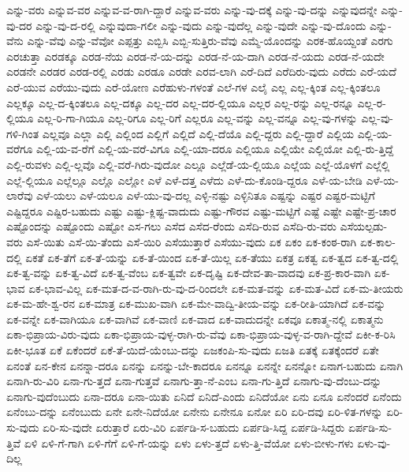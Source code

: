 {ಎನ್ನು-ವರು
ಎನ್ನುವ-ವರ
ಎನ್ನುವ-ವ-ರಾಗಿ-ದ್ದಾರೆ
ಎನ್ನುವ-ವರು
ಎನ್ನು-ವು-ದಕ್ಕೆ
ಎನ್ನು-ವು-ದನ್ನು
ಎನ್ನುವುದನ್ನೇ
ಎನ್ನು-ವು-ದರ
ಎನ್ನು-ವು-ದ-ರಲ್ಲಿ
ಎನ್ನುವುದಾ-ಗಲೀ
ಎನ್ನು-ವುದು
ಎನ್ನು-ವುದೆಲ್ಲ
ಎನ್ನು-ವುದೇ
ಎನ್ನು-ವು-ದೊಂದು
ಎನ್ನು-ವೆನು
ಎನ್ನು-ವೆವು
ಎನ್ನು-ವೆವೋ
ಎಪ್ಪತ್ತು
ಎಬ್ಬಿಸಿ
ಎಬ್ಬಿ-ಸುತ್ತಿರು-ವೆವು
ಎಮ್ಮೆ-ಯೊಂದನ್ನು
ಎರಕ-ಹೊಯ್ದಂತೆ
ಎರಗು
ಎರಚುತ್ತಾ
ಎರಡಕ್ಕೂ
ಎರಡ-ನೆಯ
ಎರಡ-ನೆ-ಯ-ದನ್ನು
ಎರಡ-ನೆ-ಯ-ದಾಗಿ
ಎರಡ-ನೆ-ಯದು
ಎರಡ-ನೆ-ಯದೇ
ಎರಡನೇ
ಎರಡರ
ಎರಡ-ರಲ್ಲಿ
ಎರಡು
ಎರಡೂ
ಎರಡೇ
ಎರವ-ಲಾಗಿ
ಎರೆ-ದಿದೆ
ಎರೆದಿರು-ವುದು
ಎರೆದು
ಎರೆ-ಯದೆ
ಎರೆ-ಯುವ
ಎರೆಯು-ವುದು
ಎರೆ-ಯೋಣ
ಎರೆಹುಳು-ಗಳಂತೆ
ಎಲೆ-ಗಳ
ಎಲೈ
ಎಲ್ಲ
ಎಲ್ಲ-ಕ್ಕಿಂತ
ಎಲ್ಲ-ಕ್ಕಿಂತಲೂ
ಎಲ್ಲಕ್ಕೂ
ಎಲ್ಲ-ದ-ಕ್ಕಿಂತಲೂ
ಎಲ್ಲ-ದಕ್ಕೂ
ಎಲ್ಲ-ದರ
ಎಲ್ಲ-ದರ-ಲ್ಲಿಯೂ
ಎಲ್ಲರ
ಎಲ್ಲ-ರನ್ನು
ಎಲ್ಲ-ರನ್ನೂ
ಎಲ್ಲ-ರ-ಲ್ಲಿಯೂ
ಎಲ್ಲ-ರಿ-ಗಾ-ಗಿಯೂ
ಎಲ್ಲ-ರಿಗೂ
ಎಲ್ಲ-ರಿಗೆ
ಎಲ್ಲರೂ
ಎಲ್ಲ-ವನ್ನು
ಎಲ್ಲ-ವನ್ನೂ
ಎಲ್ಲ-ವು-ಗಳನ್ನು
ಎಲ್ಲ-ವು-ಗಳಿ-ಗಿಂತ
ಎಲ್ಲವೂ
ಎಲ್ಲಾ
ಎಲ್ಲಿ
ಎಲ್ಲಿಂದ
ಎಲ್ಲಿಗೆ
ಎಲ್ಲಿದೆ
ಎಲ್ಲಿ-ದೆಯೊ
ಎಲ್ಲಿ-ದ್ದರು
ಎಲ್ಲಿ-ದ್ದಾರೆ
ಎಲ್ಲಿಯ
ಎಲ್ಲಿ-ಯ-ವರೆಗೂ
ಎಲ್ಲಿ-ಯ-ವ-ರೆಗೆ
ಎಲ್ಲಿ-ಯ-ವರೆ-ವಿಗೂ
ಎಲ್ಲಿ-ಯಾ-ದರೂ
ಎಲ್ಲಿಯೂ
ಎಲ್ಲಿಯೇ
ಎಲ್ಲಿಯೋ
ಎಲ್ಲಿ-ರು-ತ್ತಿದ್ದೆ
ಎಲ್ಲಿ-ರುವಳು
ಎಲ್ಲಿ-ಲ್ಲವೊ
ಎಲ್ಲಿ-ವರೆ-ಗಿರು-ವುದೋ
ಎಲ್ಲೂ
ಎಲ್ಲೆಡೆ-ಯ-ಲ್ಲಿಯೂ
ಎಲ್ಲೆಯ
ಎಲ್ಲೆ-ಯೊಳಗೆ
ಎಲ್ಲೆಲ್ಲಿ
ಎಲ್ಲೆ-ಲ್ಲಿಯೂ
ಎಲ್ಲೆಲ್ಲೂ
ಎಲ್ಲೊ
ಎಲ್ಲೋ
ಎಳೆ
ಎಳೆ-ದತ್ತ
ಎಳೆದು
ಎಳೆ-ದು-ಕೊಂಡಿ-ದ್ದರೂ
ಎಳೆ-ಯ-ಬೇಡಿ
ಎಳೆ-ಯ-ಲಾರೆವು
ಎಳೆ-ಯಲು
ಎಳೆ-ಯಲೂ
ಎಳೆ-ಯು-ವು-ದಲ್ಲ
ಎಳ್ಳಿ-ನಷ್ಟು
ಎಳ್ಳಿನಿತೂ
ಎಷ್ಟನ್ನು
ಎಷ್ಟರ
ಎಷ್ಟರ-ಮಟ್ಟಿಗೆ
ಎಷ್ಟಿದ್ದರೂ
ಎಷ್ಟಿರ-ಬಹುದು
ಎಷ್ಟು
ಎಷ್ಟು-ಕ್ಲಿಷ್ಟ-ವಾದುದು
ಎಷ್ಟು-ಗೌರವ
ಎಷ್ಟು-ಮಟ್ಟಿಗೆ
ಎಷ್ಟೆ
ಎಷ್ಟೇ
ಎಷ್ಟೇ-ಪ್ರ-ಚಾರ
ಎಷ್ಟೊಂದನ್ನು
ಎಷ್ಟೊಂದು
ಎಷ್ಟೋ
ಎಸ-ಗಲು
ಎಸೆದ
ಎಸೆದ-ರೆಂದು
ಎಸೆದಿ-ರುವ
ಎಸೆದಿ-ರು-ವರು
ಎಸೆಯಲ್ಪಡು-ವರು
ಎಸೆ-ಯಿತು
ಎಸೆ-ಯಿ-ತೆಂದು
ಎಸೆ-ಯಿರಿ
ಎಸೆಯುತ್ತಾರೆ
ಎಸೆಯು-ವುದು
ಏಕ
ಏಕಂ
ಏಕ-ಕಂಠ-ರಾಗಿ
ಏಕ-ಕಾಲ-ದಲ್ಲಿ
ಏಕತೆ
ಏಕ-ತೆಗೆ
ಏಕ-ತೆ-ಯನ್ನು
ಏಕ-ತೆ-ಯಿಂದ
ಏಕ-ತೆ-ಯಿಲ್ಲ
ಏಕ-ತೆಯು
ಏಕತ್ರ
ಏಕತ್ವ
ಏಕ-ತ್ವದ
ಏಕ-ತ್ವ-ದಲ್ಲಿ
ಏಕ-ತ್ವ-ವನ್ನು
ಏಕ-ತ್ವ-ವಿದೆ
ಏಕ-ತ್ವ-ವೆಂಬ
ಏಕ-ತ್ವವೇ
ಏಕ-ದೃಷ್ಟಿ
ಏಕ-ದೇವ-ತಾ-ವಾದವು
ಏಕ-ಪ್ರ-ಕಾರ-ವಾಗಿ
ಏಕ-ಭಾವ
ಏಕ-ಭಾವ-ವಿಲ್ಲ
ಏಕ-ಮತ-ದ-ವ-ರಾಗಿ-ರು-ವು-ದ-ರಿಂದಲೇ
ಏಕ-ಮತ-ವನ್ನು
ಏಕ-ಮತ-ವಿದೆ
ಏಕ-ಮ-ತೀಯರು
ಏಕ-ಮ-ಹೇ-ಶ್ವ-ರನ
ಏಕ-ಮಾತ್ರ
ಏಕ-ಮುಖ-ವಾಗಿ
ಏಕ-ಮೇ-ವಾದ್ವಿ-ತೀಯ-ವನ್ನು
ಏಕ-ರೀತಿ-ಯಾಗಿದೆ
ಏಕ-ವನ್ನು
ಏಕ-ವನ್ನೇ
ಏಕ-ವಾಗಿಯೂ
ಏಕ-ವಾಗಿವೆ
ಏಕ-ವಾಣಿ
ಏಕ-ವಾದ
ಏಕ-ವಾದುದನ್ನೇ
ಏಕವೂ
ಏಕಾತ್ಮ-ನಲ್ಲಿ
ಏಕಾತ್ಮನು
ಏಕಾ-ಭಿಪ್ರಾಯ-ವಿರು-ವುದು
ಏಕಾ-ಭಿಪ್ರಾಯ-ವುಳ್ಳ-ರಾಗಿ-ರು-ವೆವು
ಏಕಾ-ಭಿಪ್ರಾಯ-ವುಳ್ಳ-ವ-ರಾಗಿ-ದ್ದೇವೆ
ಏಕೀ-ಕ-ರಿಸಿ
ಏಕೀ-ಭೂತ
ಏಕೆ
ಏಕೆಂದರೆ
ಏಕೆ-ತೆ-ಯಿದೆ-ಯೆಂಬು-ದನ್ನು
ಏಜಕಂಪಿ-ಸು-ವುದು
ಏಜತಿ
ಏತಕ್ಕೆ
ಏತಕ್ಕೆಂದರೆ
ಏತೇ
ಏನಂತೆ
ಏನ-ಕೇನ
ಏನನ್ನಾ-ದರೂ
ಏನನ್ನು
ಏನನ್ನು-ಬೇ-ಕಾದರೂ
ಏನನ್ನೂ
ಏನನ್ನೇ
ಏನನ್ನೋ
ಏನಾಗ-ಬಹುದು
ಏನಾಗಿ
ಏನಾಗಿ-ರು-ವಿರಿ
ಏನಾ-ಗು-ತ್ತದೆ
ಏನಾ-ಗುತ್ತವೆ
ಏನಾಗು-ತ್ತಾ-ನೆ-ಎಂಬ
ಏನಾ-ಗು-ತ್ತಿದೆ
ಏನಾಗು-ವು-ದೆಂಬು-ದನ್ನು
ಏನಾಗು-ವುದೆಂಬುದು
ಏನಾ-ದರೂ
ಏನಾ-ಯಿತು
ಏನಿದೆ
ಏನಿದೆ-ಎಂದು
ಏನಿದೆಯೋ
ಏನು
ಏನೂ
ಏನೆಂದರೆ
ಏನೆಂದು
ಏನೆಂಬು-ದನ್ನು
ಏನೆಂಬುದು
ಏನೇ
ಏನೇ-ನಿದೆಯೋ
ಏನೇನು
ಏನೇನೂ
ಏನೋ
ಏರಿ
ಏರಿ-ದವು
ಏರಿ-ಳಿತ-ಗಳನ್ನು
ಏರಿ-ಸು-ವುದು
ಏರಿ-ಸು-ವುದೇ
ಏರುತ್ತಾರೆ
ಏರು-ವಿರಿ
ಏರ್ಪಡಿ-ಸ-ಬಹುದು
ಏರ್ಪಡಿ-ಸಿದ್ದ
ಏರ್ಪಡಿ-ಸಿದ್ದರು
ಏರ್ಪಡಿ-ಸು-ತ್ತಿವೆ
ಏಳಿ
ಏಳಿ-ಗೆ-ಗಾಗಿ
ಏಳಿ-ಗೆಗೆ
ಏಳಿ-ಗೆ-ಯನ್ನು
ಏಳು
ಏಳು-ತ್ತದೆ
ಏಳು-ತ್ತಿ-ವೆಯೋ
ಏಳು-ಬೀಳು-ಗಳು
ಏಳು-ವು-ದಿಲ್ಲ
}
